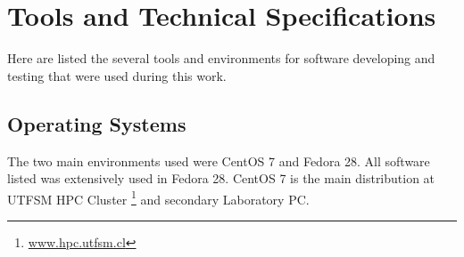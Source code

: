 


\chapter{Tools and Technical Specifications}

Here are listed the several tools and environments for software developing and testing that were used during this work.

\section{Operating Systems}
The two main environments used were CentOS 7 and Fedora 28. All software listed was extensively used in Fedora 28. CentOS 7 is the main distribution at UTFSM HPC Cluster \footnote{\url{www.hpc.utfsm.cl}} and secondary Laboratory PC.

